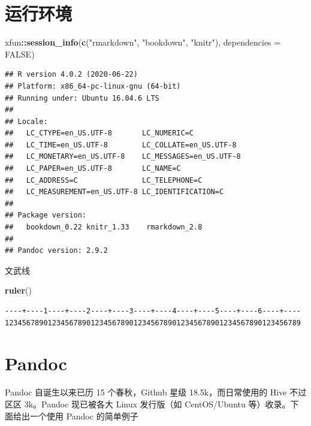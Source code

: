 \documentclass[
  lang=cn,
  11pt,
  scheme=chinese,
  chinesefont=nofont,
  citestyle=gb7714-2015,
  bibstyle=gb7714-2015]{elegantbook}
\newenvironment{Shaded}{\begin{snugshade}}{\end{snugshade}}
\newcommand{\DataTypeTok}[1]{\textcolor[rgb]{0.13,0.29,0.53}{#1}}
\newcommand{\KeywordTok}[1]{\textcolor[rgb]{0.13,0.29,0.53}{\textbf{#1}}}
\newcommand{\NormalTok}[1]{#1}
\newcommand{\OperatorTok}[1]{\textcolor[rgb]{0.81,0.36,0.00}{\textbf{#1}}}
\newcommand{\OtherTok}[1]{\textcolor[rgb]{0.56,0.35,0.01}{#1}}
\newcommand{\StringTok}[1]{\textcolor[rgb]{0.31,0.60,0.02}{#1}}
\begin{document}
\hypertarget{session-info}{%
\section{运行环境}\label{session-info}}

\begin{Shaded}
\begin{Highlighting}[]
\NormalTok{xfun}\OperatorTok{::}\KeywordTok{session\_info}\NormalTok{(}\KeywordTok{c}\NormalTok{(}\StringTok{"rmarkdown"}\NormalTok{, }\StringTok{"bookdown"}\NormalTok{, }\StringTok{"knitr"}\NormalTok{), }\DataTypeTok{dependencies =} \OtherTok{FALSE}\NormalTok{)}
\end{Highlighting}
\end{Shaded}

\begin{verbatim}
## R version 4.0.2 (2020-06-22)
## Platform: x86_64-pc-linux-gnu (64-bit)
## Running under: Ubuntu 16.04.6 LTS
## 
## Locale:
##   LC_CTYPE=en_US.UTF-8       LC_NUMERIC=C              
##   LC_TIME=en_US.UTF-8        LC_COLLATE=en_US.UTF-8    
##   LC_MONETARY=en_US.UTF-8    LC_MESSAGES=en_US.UTF-8   
##   LC_PAPER=en_US.UTF-8       LC_NAME=C                 
##   LC_ADDRESS=C               LC_TELEPHONE=C            
##   LC_MEASUREMENT=en_US.UTF-8 LC_IDENTIFICATION=C       
## 
## Package version:
##   bookdown_0.22 knitr_1.33    rmarkdown_2.8
## 
## Pandoc version: 2.9.2
\end{verbatim}

文武线

\begin{Shaded}
\begin{Highlighting}[]
\KeywordTok{ruler}\NormalTok{()}
\end{Highlighting}
\end{Shaded}

\begin{verbatim}
----+----1----+----2----+----3----+----4----+----5----+----6----+----
123456789012345678901234567890123456789012345678901234567890123456789
\end{verbatim}

\hypertarget{pandoc}{%
\section{Pandoc}\label{pandoc}}

Pandoc 自诞生以来已历 15 个春秋，Github 星级 18.5k，而日常使用的 Hive 不过区区 3k。Pandoc 现已被各大 Linux 发行版（如 CentOS/Ubuntu 等）收录。下面给出一个使用 Pandoc 的简单例子
\end{document}
